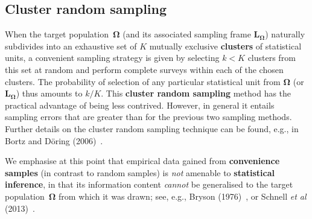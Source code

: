 \subsection[Cluster random sampling]{Cluster random sampling}
When the target population~$\boldsymbol{\Omega}$ (and its 
associated sampling frame $\boldsymbol{L_{\Omega}}$) naturally 
subdivides into an exhaustive set of $K$ mutually exclusive
\textbf{clusters} of statistical units, a convenient sampling
strategy is given by selecting $k < K$ clusters from this set at
random and perform complete surveys within each of the chosen
clusters. The probability of selection of any particular
statistical unit from $\boldsymbol{\Omega}$ (or
$\boldsymbol{L_{\Omega}}$) thus amounts to $k/K$. This
\textbf{cluster random sampling} method has the practical advantage
of being less contrived. However, in general it entails sampling
errors that are greater than for the previous two sampling methods.
Further details on the cluster random sampling technique can be
found, e.g., in Bortz and D\"{o}ring
(2006)~.

\vspace{5mm}
\noindent
We emphasise at this point that empirical data gained from
\textbf{convenience samples} (in contrast to random samples) is
\textit{not} amenable to \textbf{statistical inference}, in that
its information content \textit{cannot} be generalised to the
target population~$\boldsymbol{\Omega}$ from which it was drawn;
see, e.g., Bryson (1976)~, or Schnell \textit{et
al} (2013)~.

